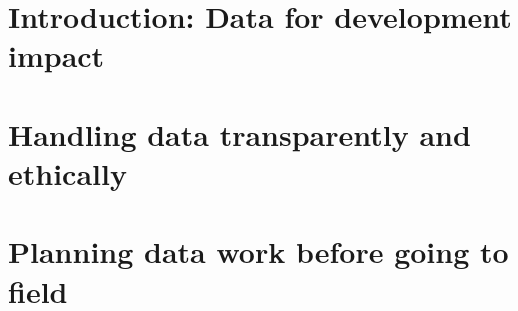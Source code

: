 %
%
%
%




\cleardoublepage
\chapter{Introduction: Data for development impact} %




\chapter{Handling data transparently and ethically}
\label{ch:1}




\chapter{Planning data work before going to field}
\label{ch:2}




